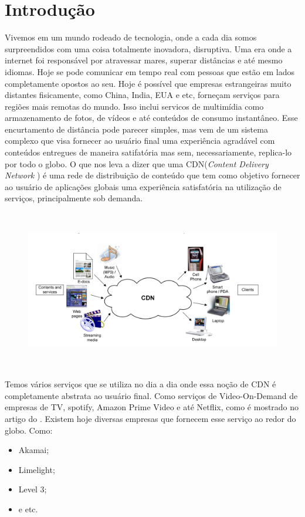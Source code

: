 \section{Introdu\c{c}\~ao}


Vivemos em um mundo rodeado de tecnologia, onde a cada dia somos surpreendidos com uma coisa totalmente inovadora, disruptiva. Uma era onde a internet foi respons\'avel por atravessar mares, superar dist\^ancias e at\'e mesmo idiomas. Hoje se pode comunicar em tempo real com pessoas que est\~ao em lados completamente opostos ao seu. 
\newline
Hoje \'e poss\'ivel que empresas estrangeiras muito distantes fisicamente, como China, India, EUA e etc, forne\c{c}am servi\c{c}os para regi\~oes mais remotas do mundo. Isso inclui servi{c}os de multim\'idia como armazenamento de fotos, de v\'ideos e at\'e conte\'udos de consumo instant\^aneo.
\newline
Esse encurtamento de dist\^ancia pode parecer simples, mas vem de um sistema complexo que visa fornecer ao usu\'ario final uma experi\^encia agrad\'avel com conte\'udos entregues de maneira satifat\'oria mas sem, necessariamente, replica-lo por todo o globo. O que nos leva a dizer que uma CDN(\textit{Content Delivery Network} ) \'e uma rede de distribui\c{c}\~ao de conte\'udo que tem como objetivo fornecer ao usu\'ario de aplica\c{c}\~oes globais uma experi\^encia satisfat\'oria na utiliza\c{c}\~ao de servi\c{c}os, principalmente sob demanda.
\begin{figure}[H]
\includegraphics[height=7cm]{Figuras/contextualizacao.png} 
\label{figura:contextualizacao} 
\end{figure}
Temos v\'arios servi\c{c}os que se utiliza no dia a dia onde essa no\c{c}\~ao de CDN \'e completamente abstrata ao usu\'ario final. Como servi\c{c}os de Video-On-Demand de empresas de TV, spotify, Amazon Prime Video e at\'e Netflix, como \'e mostrado no artigo do \cite{adhikari2012unreeling}.
\newline
Existem hoje diversas empresas que fornecem esse servi\c{c}o ao redor do globo. Como:
\begin{itemize}
\item Akamai;
\item Limelight;
\item Level 3;
\item e etc.
\end{itemize}

